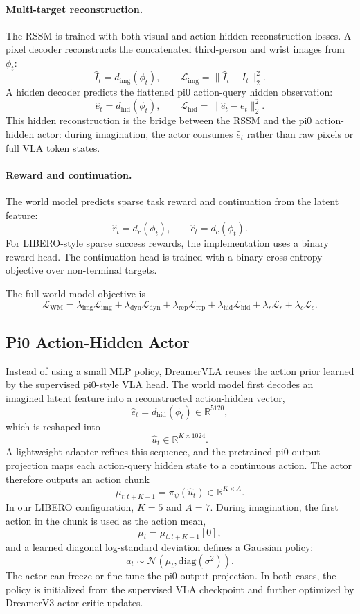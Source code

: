 \paragraph{Multi-target reconstruction.}
The RSSM is trained with both visual and action-hidden reconstruction losses. A pixel decoder reconstructs the concatenated third-person and wrist images from $\phi_t$:
\[
\hat{I}_t = d_{\text{img}}(\phi_t),
\qquad
\mathcal{L}_{\text{img}} = \|\hat{I}_t - I_t\|_2^2.
\]
A hidden decoder predicts the flattened pi0 action-query hidden observation:
\[
\hat{e}_t = d_{\text{hid}}(\phi_t),
\qquad
\mathcal{L}_{\text{hid}} = \|\hat{e}_t - e_t\|_2^2.
\]
This hidden reconstruction is the bridge between the RSSM and the pi0 action-hidden actor: during imagination, the actor consumes $\hat{e}_t$ rather than raw pixels or full VLA token states.

\paragraph{Reward and continuation.}
The world model predicts sparse task reward and continuation from the latent feature:
\[
\hat{r}_t = d_r(\phi_t), \qquad \hat{c}_t = d_c(\phi_t).
\]
For LIBERO-style sparse success rewards, the implementation uses a binary reward head. The continuation head is trained with a binary cross-entropy objective over non-terminal targets.

The full world-model objective is
\[
\mathcal{L}_{\text{WM}}
=
\lambda_{\text{img}}\mathcal{L}_{\text{img}}
+ \lambda_{\text{dyn}}\mathcal{L}_{\text{dyn}}
+ \lambda_{\text{rep}}\mathcal{L}_{\text{rep}}
+ \lambda_{\text{hid}}\mathcal{L}_{\text{hid}}
+ \lambda_r\mathcal{L}_{r}
+ \lambda_c\mathcal{L}_{c}.
\]

\subsection{Pi0 Action-Hidden Actor}

Instead of using a small MLP policy, DreamerVLA reuses the action prior learned by the supervised pi0-style VLA head. The world model first decodes an imagined latent feature into a reconstructed action-hidden vector,
\[
\hat{e}_t = d_{\text{hid}}(\phi_t) \in \mathbb{R}^{5120},
\]
which is reshaped into
\[
\hat{u}_t \in \mathbb{R}^{K \times 1024}.
\]
A lightweight adapter refines this sequence, and the pretrained pi0 output projection maps each action-query hidden state to a continuous action. The actor therefore outputs an action chunk
\[
\mu_{t:t+K-1} = \pi_\psi(\hat{u}_t) \in \mathbb{R}^{K \times A}.
\]
In our LIBERO configuration, $K=5$ and $A=7$. During imagination, the first action in the chunk is used as the action mean,
\[
\mu_t = \mu_{t:t+K-1}[0],
\]
and a learned diagonal log-standard deviation defines a Gaussian policy:
\[
a_t \sim \mathcal{N}(\mu_t, \mathrm{diag}(\sigma^2)).
\]
The actor can freeze or fine-tune the pi0 output projection. In both cases, the policy is initialized from the supervised VLA checkpoint and further optimized by DreamerV3 actor-critic updates.


